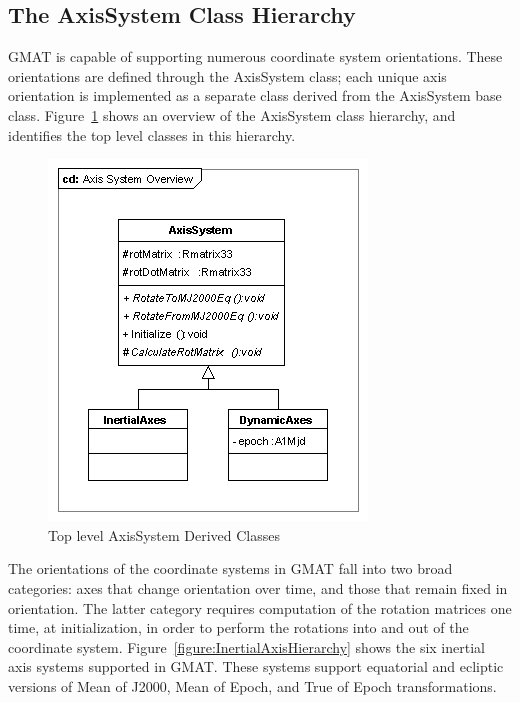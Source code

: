 \subsection{The AxisSystem Class Hierarchy}

GMAT is capable of supporting numerous coordinate system orientations.  These orientations are
defined through the AxisSystem class; each unique axis orientation is implemented as a separate
class derived from the AxisSystem base class. Figure~\ref{figure:AxisSystemOverview} shows an
overview of the AxisSystem class hierarchy, and identifies the top level classes in this hierarchy.

\begin{figure}
\begin{center}
\includegraphics[160,181]{Images/AxisSystemOverview.png}
\caption{\label{figure:AxisSystemOverview}Top level AxisSystem Derived Classes}
\end{center}
\end{figure}

The orientations of the coordinate systems in GMAT fall into two broad categories: axes that change
orientation over time, and those that remain fixed in orientation. The latter category requires
computation of the rotation matrices one time, at initialization, in order to perform the rotations
into and out of the coordinate system.  Figure~\ref{figure:InertialAxisHierarchy} shows the six
inertial axis systems supported in GMAT. These systems support equatorial and ecliptic versions
of Mean of J2000, Mean of Epoch, and True of Epoch transformations.

